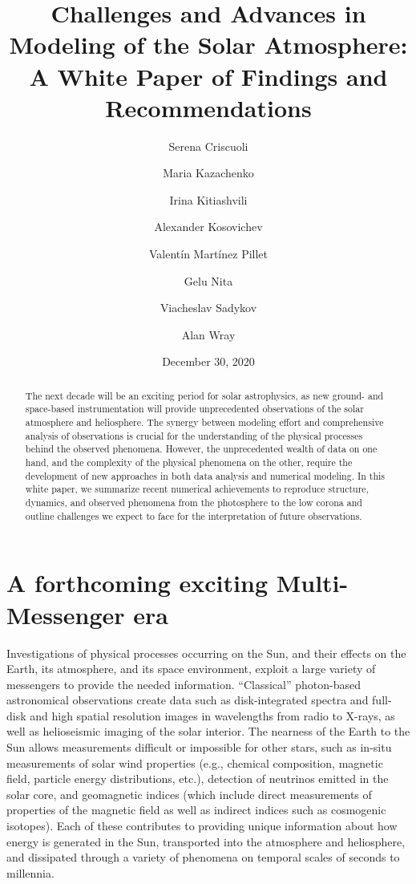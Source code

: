 \documentclass[]{article}
\title{Challenges and Advances in Modeling of the Solar Atmosphere: \\A White Paper of Findings and Recommendations }
\author[1]{Serena Criscuoli}
\author[1,2]{Maria Kazachenko}
\author[3]{Irina Kitiashvili}
\author[3,4]{Alexander Kosovichev}
\author[1]{Valent\'in Mart\'inez Pillet}
\author[4]{Gelu Nita}
\author[5,6]{Viacheslav Sadykov}
\author[3]{Alan Wray}
\affil[1]{National Solar Observatory}
\affil[2]{University of Colorado, Boulder}
\affil[3]{NASA Ames Research Center}
\affil[4]{New Jersey Institute of Technology}
\affil[5]{Bay Area Environmental Research Institute}
\affil[6]{Georgia State University}
\date{December 30, 2020}
\begin{document}
\maketitle


\begin{abstract}
The next decade will be an exciting period for solar astrophysics, as new ground- and space-based instrumentation will provide unprecedented observations of the solar atmosphere and heliosphere. The synergy between modeling effort and comprehensive analysis of observations is crucial for the understanding of the physical processes behind the observed phenomena. However, the unprecedented wealth of data on one hand, and the complexity of the physical phenomena on the other, require the development of new approaches in both data analysis and numerical modeling. In this white paper, we summarize recent numerical achievements to reproduce structure, dynamics, and observed phenomena from the photosphere to the low corona and outline challenges we expect to face for the interpretation of future observations. 

\end{abstract}

\section{A forthcoming exciting Multi-Messenger era}
Investigations of physical processes occurring on the Sun, and their effects on the Earth, its atmosphere, and its space environment, exploit a large variety of messengers to provide the needed information. “Classical” photon-based astronomical observations create data such as disk-integrated spectra and full-disk and high spatial resolution images in wavelengths from radio to X-rays, as well as helioseismic imaging of the solar interior. The nearness of the Earth to the Sun allows measurements difficult or impossible for other stars,  such as in-situ measurements of solar wind properties (e.g., chemical composition, magnetic field, particle energy distributions, etc.), detection of neutrinos emitted in the solar core, and geomagnetic indices (which include direct measurements of properties of the magnetic field as well as indirect indices such as cosmogenic isotopes).  Each of these contributes to providing unique information about how energy is generated in the Sun, transported into the atmosphere and heliosphere, and  dissipated through a variety of phenomena on temporal scales of seconds to millennia.  
\end{document}
